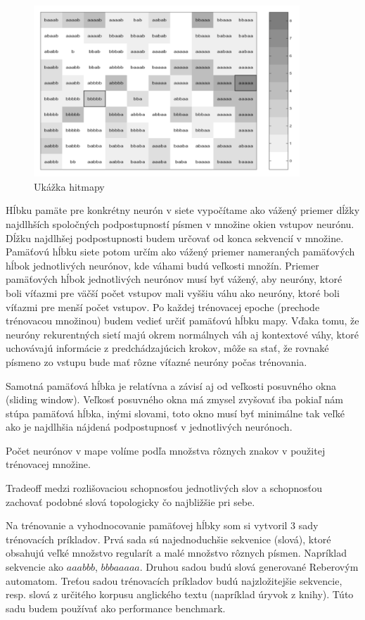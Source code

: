 \begin{figure}[H]
	\centering
	\includegraphics[width=10cm]{assets/receptive_field}
	\caption{Ukážka hitmapy}
\end{figure}

Hĺbku pamäte pre konkrétny neurón v siete vypočítame ako vážený priemer dĺžky najdlhších spoločných 
podpostupností písmen v množine okien vstupov neurónu.
Dĺžku najdlhšej podpostupnosti budem určovať od konca sekvencií v množine. 
Pamäťovú hĺbku siete potom určím ako vážený priemer nameraných pamäťových hĺbok jednotlivých neurónov, kde váhami budú veľkosti
množín.
Priemer pamäťových hĺbok jednotlivých neurónov musí byť vážený, aby neuróny, 
ktoré boli víťazmi pre väčší počet vstupov mali vyššiu váhu ako neuróny, ktoré boli víťazmi pre menší počet vstupov.
Po každej trénovacej epoche (prechode trénovacou množinou) budem vedieť určiť pamäťovú hĺbku mapy.
Vďaka tomu, že neuróny rekurentných sietí majú okrem normálnych váh aj kontextové váhy, 
ktoré uchovávajú informácie z predchádzajúcich krokov, môže sa stať, že rovnaké písmeno zo vstupu 
bude mať rôzne víťazné neuróny počas trénovania.


Samotná pamäťová hĺbka je relatívna a závisí aj od veľkosti posuvného okna (sliding window).
Veľkosť posuvného okna má zmysel zvyšovať iba pokiaľ nám stúpa pamäťová hĺbka, inými
slovami, toto okno musí byť minimálne tak veľké ako je najdlhšia nájdená podpostupnosť v jednotlivých neurónoch.

Počet neurónov v mape volíme podľa množstva rôznych znakov v použitej trénovacej množine.

Tradeoff medzi rozlišovaciou schopnosťou jednotlivých slov a schopnosťou
zachovať podobné slová topologicky čo najbližšie pri sebe.

Na trénovanie a vyhodnocovanie pamäťovej hĺbky som si vytvoril 3 sady 
trénovacích príkladov. 
Prvá sada sú najednoduchšie sekvenice (slová), ktoré obsahujú veľké množstvo regularít a malé množstvo rôznych písmen.
Napríklad sekvencie ako $aaabbb$,  $bbbaaaaa$.
Druhou sadou budú slová generované Reberovým automatom.
Treťou sadou trénovacích príkladov budú najzložitejšie sekvencie, resp. slová z určitého korpusu anglického textu (napríklad úryvok z knihy). 
Túto sadu budem používať ako performance benchmark. 

